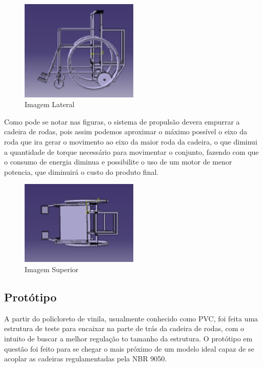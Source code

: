 \begin{figure}[!htb]
\centering
\includegraphics[width=0.5\textwidth]{figuras/estrutura/vista_lateral_cadeira}
\caption{Imagem Lateral}
\label{fig:lateral}
\end{figure}

Como pode se notar nas figuras, o sistema de propulsão devera empurrar a cadeira de rodas, pois assim podemos aproximar o máximo possível o eixo da roda que ira gerar o movimento ao eixo da maior roda da cadeira, o que diminui a quantidade de torque necessário para movimentar o conjunto, fazendo com que o consumo de energia diminua e possibilite o uso de um motor de menor potencia, que diminuirá o custo do produto final.

\begin{figure}[!htb]
\centering
\includegraphics[width=0.5\textwidth]{figuras/estrutura/vista_superior}
\caption{Imagem Superior}
\label{fig:superior}
\end{figure}

\subsection{Protótipo}

A partir do policloreto de vinila, usualmente conhecido como PVC, foi feita uma estrutura de teste para encaixar na parte de trás da cadeira de rodas, com o intuito de buscar a melhor regulação to tamanho da estrutura. O protótipo em questão foi feito para se chegar o mais próximo de um modelo ideal capaz de se acoplar as cadeiras regulamentadas pela NBR 9050.

